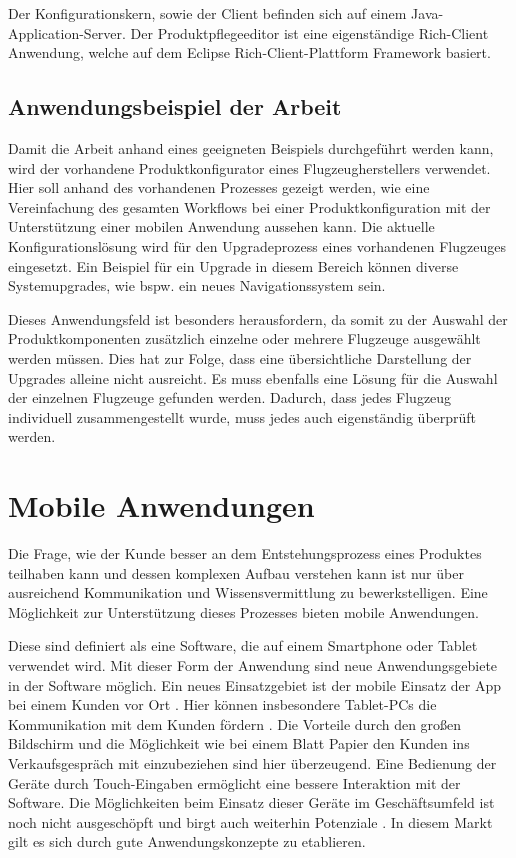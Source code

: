 Der Konfigurationskern, sowie der Client befinden sich auf einem Java-Application-Server. Der Produktpflegeeditor ist eine eigenständige Rich-Client Anwendung, welche auf dem Eclipse Rich-Client-Plattform Framework\cite{bib:eclipseRCP} basiert.

\subsection{Anwendungsbeispiel der Arbeit} \label{airbusConfigurator}
Damit die Arbeit anhand eines geeigneten Beispiels durchgeführt werden kann, wird der vorhandene Produktkonfigurator eines Flugzeugherstellers verwendet. Hier soll anhand des vorhandenen Prozesses gezeigt werden, wie eine Vereinfachung des gesamten Workflows bei einer Produktkonfiguration mit der Unterstützung einer mobilen Anwendung aussehen kann. 
Die aktuelle Konfigurationslösung wird für den Upgradeprozess eines vorhandenen Flugzeuges eingesetzt. Ein Beispiel für ein Upgrade in diesem Bereich können diverse Systemupgrades, wie bspw. ein neues Navigationssystem sein. \par
Dieses Anwendungsfeld ist besonders herausfordern, da somit zu der Auswahl der Produktkomponenten zusätzlich einzelne oder mehrere Flugzeuge ausgewählt werden müssen. Dies hat zur Folge, dass eine übersichtliche Darstellung der Upgrades alleine nicht ausreicht. Es muss ebenfalls eine Lösung für die Auswahl der einzelnen Flugzeuge gefunden werden.  Dadurch, dass jedes Flugzeug individuell zusammengestellt wurde, muss jedes auch eigenständig überprüft werden. 


\section{Mobile Anwendungen} \label{mobileAppsGrundlagen}
Die Frage, wie der Kunde besser an dem Entstehungsprozess eines Produktes teilhaben kann und dessen komplexen Aufbau verstehen kann ist nur über ausreichend Kommunikation und Wissensvermittlung zu bewerkstelligen. Eine Möglichkeit zur Unterstützung dieses Prozesses bieten mobile Anwendungen.\par

Diese sind definiert als eine Software, die auf einem Smartphone oder Tablet verwendet wird. Mit dieser Form der Anwendung sind neue Anwendungsgebiete in der Software möglich. Ein neues Einsatzgebiet ist der mobile Einsatz der App bei einem Kunden vor Ort \cite{bib:mobileMarketing}. Hier können insbesondere Tablet-PCs die Kommunikation mit dem Kunden fördern \cite{bib:tableVertrieb}. Die Vorteile durch den großen Bildschirm und die Möglichkeit wie bei einem Blatt Papier den Kunden ins Verkaufsgespräch mit einzubeziehen sind hier überzeugend. Eine Bedienung der Geräte durch Touch-Eingaben ermöglicht eine bessere Interaktion mit der Software. Die Möglichkeiten beim Einsatz dieser Geräte im Geschäftsumfeld ist noch nicht ausgeschöpft und birgt auch weiterhin Potenziale \cite[Fazit]{bib:mobileMarketing2}. In diesem Markt gilt es sich durch gute Anwendungskonzepte zu etablieren. \par

